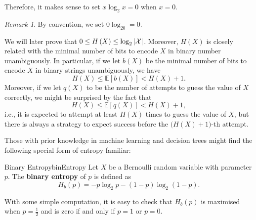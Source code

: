 \documentclass[math]{amznotes}
\theoremstyle{remark}
\newtheorem*{remark}{Remark}
\begin{document}
Therefore, it makes sense to set $x\log_2x = 0$ when $x = 0$.
\begin{notebox}
    \begin{remark}
        By convention, we set $0\log_20 = 0$.
    \end{remark}
\end{notebox}
We will later prove that $0 \leq H\left(X\right) \leq \log_2{\left\lvert {\mathcal{X}} \right\rvert}$. Moreover, $H\left(X\right)$ is closely related with the minimal number of bits to encode $X$ in binary number unambiguously. In particular, if we let $b\left(X\right)$ be the minimal number of bits to encode $X$ in binary strings unambiguously, we have 
\begin{equation*}
    H\left(X\right) \leq \mathbb{E}[b\left(X\right)] < H\left(X\right) + 1.
\end{equation*}
Moreover, if we let $q\left(X\right)$ to be the number of attempts to guess the value of $X$ correctly, we might be surprised by the fact that 
\begin{equation*}
    H\left(X\right) \leq \mathbb{E}[q\left(X\right)] < H\left(X\right) + 1,
\end{equation*}
i.e., it is expected to attempt at least $H\left(X\right)$ times to guess the value of $X$, but there is always a strategy to expect success before the $\bigl(H\left(X\right) + 1\bigr)$-th attempt.

Those with prior knowledge in machine learning and decision trees might find the following special form of entropy familiar:
\begin{dfnbox}{Binary Entropy}{binEntropy}
    Let $X$ be a Bernoulli random variable with parameter $p$. The {\color{red} \textbf{binary entropy}} of $p$ is defined as 
    \begin{equation*}
        H_b\left(p\right) = -p\log_2p - \left(1 - p\right)\log_2\left(1 - p\right).
    \end{equation*}
\end{dfnbox}
With some simple computation, it is easy to check that $H_b\left(p\right)$ is maximised when $p = \frac{1}{2}$ and is zero if and only if $p = 1$ or $p = 0$.
\end{document}
